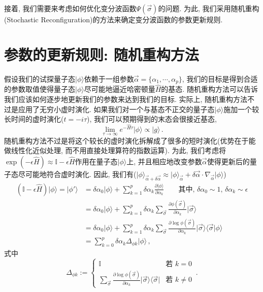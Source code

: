\documentclass[10pt]{article}
\newcommand{\qket}{\rangle}
\newcommand{\qbar}{\langle}
\begin{document}
接着, 我们需要来考虑如何优化变分波函数$\Psi(\vec{\sigma})$的问题. 
为此, 我们采用随机重构(Stochastic Reconfiguration)的方法来确定变分波函数的参数更新规则. 


\section{参数的更新规则: 随机重构方法}

假设我们的试探量子态$\lvert\phi\qket$依赖于一组参数$\vec{\alpha}=\{\alpha_{1}, \cdots, \alpha_{p}\}$, 我们的目标是得到合适的参数取值使得量子态$\lvert\phi\qket$尽可能地逼近哈密顿量$\hat{H}$的基态. 
随机重构方法可以告诉我们应该如何逐步地更新我们的参数来达到我们的目标. 
实际上, 随机重构方法不过是应用了无穷小虚时演化.
如果我们对一个与基态不正交的量子态$\lvert\phi\qket$施加一个较长时间的虚时演化($t=-i\tau$), 我们可以预期得到的末态会很接近基态, 
\[ \lim_{\tau\rightarrow\infty}e^{-\hat{H}\tau} \lvert\phi\qket \propto \lvert g\qket\,. \]
随机重构方法不过是将这个较长的虚时演化拆解成了很多的短时演化(优势在于能做线性化近似处理, 而不用直接处理算符的指数运算). 
为此, 我们考虑将$\exp{(-\epsilon\hat{H})}\approx\mathbb{I}-\epsilon\hat{H}$作用在量子态$\lvert\phi\qket$上, 并且相应地改变参数$\vec{\alpha}$使得更新后的量子态尽可能地符合虚时演化. 
因此, 我们有($\lvert\phi\qket_{\vec{\alpha}+\delta\vec{\alpha}}\approx\lvert\phi\qket_{\vec{\alpha}}+\delta\vec{\alpha}\cdot\nabla_{\vec{\alpha}}\lvert\phi\qket$)
\begin{align}
(\mathbb{I}-\epsilon\hat{H})\lvert\phi\qket = \lvert\phi'\qket & = \delta\alpha_{0}\lvert\phi\qket + \sum_{k=1}^{p}\delta\alpha_{k}\frac{\partial\lvert\phi\qket}{\partial\alpha_{k}} \qquad{} \text{其中, $\delta\alpha_{0}\sim 1$, $\delta\alpha_{k}\sim\epsilon$} \nonumber \\
& = \delta\alpha_{0}\lvert\phi\qket + \sum_{k=1}^{p} \delta\alpha_{k} \sum_{\vec{\sigma}} \frac{\partial\phi(\vec{\sigma})}{\partial\alpha_{k}} \lvert\vec{\sigma}\qket \nonumber \\
& = \delta\alpha_{0}\lvert\phi\qket + \sum_{k=1}^{p} \delta\alpha_{k} \sum_{\vec{\sigma}} \frac{\partial\log{\phi(\vec{\sigma})}}{\partial\alpha_{k}} \lvert\vec{\sigma}\qket\qbar\vec{\sigma}\vert\phi\qket \nonumber \\ 
& = \sum_{k=0}^{p} \delta\alpha_{k} \Delta_{\phi k} \lvert\phi\qket\,,
\end{align}
式中
\[ \Delta_{\phi k} := \begin{cases} \mathbb{I} & \text{若 } k = 0\\ \sum_{\vec{\sigma}}\frac{\partial\log\phi(\vec{\sigma})}{\partial\alpha_k}\lvert\vec{\sigma}\qket\qbar\vec{\sigma}\rvert & \text{若 } k \neq 0 \end{cases}\,. \]
\end{document}
